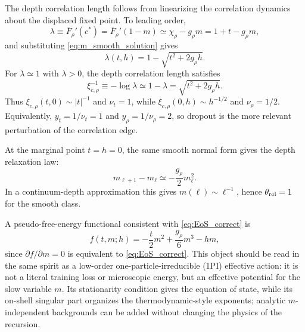 \documentclass{article}
\theoremstyle{plain}
\theoremstyle{definition}
\theoremstyle{remark}
\begin{document}
\vspace{0.25em}
\noindent
The depth correlation length follows from linearizing the correlation dynamics about the displaced fixed point.
To leading order,
\relax
\begin{equation}
\lambda \equiv \bar F_\rho'(c^*) = \bar F_\rho'(1-m)\simeq \chi_\rho-g_\rho m = 1+t-g_\rho m,
\end{equation}
\relax
and substituting \eqref{eq:m_smooth_solution} gives
\relax
\begin{equation}
\lambda(t,h)=1-\sqrt{t^2+2g_\rho h}.
\label{eq:lambda_smooth_correct}
\end{equation}
\relax
For \(\lambda\simeq 1\) with \(\lambda>0\), the depth correlation length satisfies
\relax
\begin{equation}
\xi_{c,\rho}^{-1}\equiv -\log\lambda \simeq 1-\lambda = \sqrt{t^2+2g_\rho h}.
\end{equation}
\relax
Thus \(\xi_{c,\rho}(t,0)\sim |t|^{-1}\) and \(\nu_t=1\), while \(\xi_{c,\rho}(0,h)\sim h^{-1/2}\) and \(\nu_\rho=1/2\).
Equivalently, \(y_t=1/\nu_t=1\) and \(y_\rho=1/\nu_\rho=2\), so dropout is the more relevant perturbation of the correlation edge.

At the marginal point \(t=h=0\), the same smooth normal form gives the depth relaxation law:
\relax
\begin{equation}
m_{\ell+1}-m_\ell\simeq-\frac{g_\rho}{2}m_\ell^2.
\end{equation}
\relax
In a continuum-depth approximation this gives \(m(\ell)\sim \ell^{-1}\), hence \(\theta_{\rm rel}=1\) for the smooth class.

\vspace{0.25em}
\noindent
A pseudo-free-energy functional consistent with \eqref{eq:EoS_correct} is
\relax
\begin{equation}
f(t,m;h) = -\frac{t}{2} m^2 + \frac{g_\rho}{6} m^3 - h m,
\label{eq:free_energy_correct}
\end{equation}
\relax
since \(\partial f/\partial m=0\) is equivalent to \eqref{eq:EoS_correct}. This object should be read in the same spirit as a low-order one-particle-irreducible (1PI) effective action: it is not a literal training loss or microscopic energy, but an effective potential for the slow variable \(m\). Its stationarity condition gives the equation of state, while its on-shell singular part organizes the thermodynamic-style exponents; analytic \(m\)-independent backgrounds can be added without changing the physics of the recursion.
\end{document}
